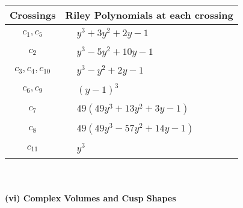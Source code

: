 \documentclass[1p]{elsarticle_modified}
\theoremstyle{definition}
\begin{document}
\begin{tabular}{m{50pt}|m{274pt}}
Crossings & \hspace{64pt}Riley Polynomials at each crossing \\
\hline $$\begin{aligned}c_{1},c_{5}\end{aligned}$$&$\begin{aligned}
&y^3+3 y^2+2 y-1
\end{aligned}$\\
\hline $$\begin{aligned}c_{2}\end{aligned}$$&$\begin{aligned}
&y^3-5 y^2+10 y-1
\end{aligned}$\\
\hline $$\begin{aligned}c_{3},c_{4},c_{10}\end{aligned}$$&$\begin{aligned}
&y^3- y^2+2 y-1
\end{aligned}$\\
\hline $$\begin{aligned}c_{6},c_{9}\end{aligned}$$&$\begin{aligned}
&(y-1)^3
\end{aligned}$\\
\hline $$\begin{aligned}c_{7}\end{aligned}$$&$\begin{aligned}
&49(49 y^3+13 y^2+3 y-1)
\end{aligned}$\\
\hline $$\begin{aligned}c_{8}\end{aligned}$$&$\begin{aligned}
&49(49 y^3-57 y^2+14 y-1)
\end{aligned}$\\
\hline $$\begin{aligned}c_{11}\end{aligned}$$&$\begin{aligned}
&y^3
\end{aligned}$\\
\hline
\end{tabular}\\~\\
\newpage\flushleft \textbf{(vi) Complex Volumes and Cusp Shapes}
\end{document}
